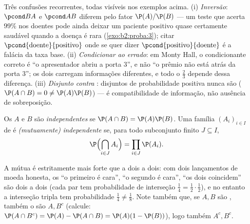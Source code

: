 \begin{remark}
Três confusões recorrentes, todas visíveis nos exemplos
acima. (i) \emph{Inversão}: $\pcond BA$ e $\pcond AB$
diferem pelo fator $\P(A)/\P(B)$ --- um teste que acerta
$99\%$ nos doentes pode ainda deixar um paciente positivo
quase certamente saudável quando a doença é rara
(\cref{exo:b2:proba:3}); citar $\pcond{\text{doente}}{
\text{positivo}}$ onde se quer dizer $\pcond{\text{positivo}}{
\text{doente}}$ é a falácia da taxa base. (ii)
\emph{Condicionar ao  errado}: em Monty Hall, o
 condicionante correto é ``o apresentador abriu a porta $3$'',
e não ``o prêmio não está atrás da porta $3$''; os dois carregam
informações diferentes, e todo o $\frac23$ depende dessa
diferença. (iii) \emph{Disjunto contra }:
 disjuntos de probabilidade positiva nunca são
 ($\P(A\cap B) = 0 \neq \P(A)\P(B)$) ---
 é compatibilidade de informação, não ausência de
sobreposição.
\end{remark}

\begin{definition}[Independência]\label{def:b2:proba:independence}
Os  $A$ e $B$ são \emph{independentes} se $\P(A \cap B) =
\P(A)\P(B)$. Uma família $(A_i)_{i \in I}$ de  é
\emph{(mutuamente) independente} se, para todo subconjunto finito $J
\subseteq I$,
\[
\P\Bigl(\bigcap_{i \in J} A_i\Bigr)
= \prod_{i \in J} \P(A_i) .
\]
\end{definition}

\begin{remark}
A  mútua é estritamente mais forte que a
 dois a dois: com dois lançamentos de moeda honesta, os  ``o primeiro é
cara'', ``o segundo é cara'', ``os dois coincidem'' são dois a dois
 (cada par tem probabilidade de interseção $\frac14 =
\frac12\cdot\frac12$), e no entanto a interseção tripla tem probabilidade
$\frac14 \neq \frac18$. Note também que, se $A, B$ são ,
também o são $A, B^c$ (calcule: $\P(A \cap B^c) = \P(A) - \P(A\cap B) =
\P(A)(1 - \P(B))$), logo também $A^c, B^c$.
\end{remark}

